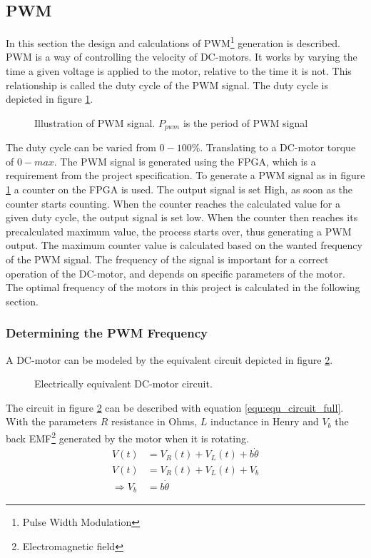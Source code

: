 \documentclass[../../../Main]{subfiles}
\begin{document}
\subsection{PWM}
\label{sec:pwm}
In this section the design  and calculations of PWM\footnote{Pulse Width Modulation} generation is described. PWM is a way of controlling the velocity of DC-motors. It works by varying the time a given voltage is applied to the motor, relative to the time it is not. This relationship is called the duty cycle of the PWM signal. The duty cycle is depicted in figure \ref{fig:pwm}.

\begin{figure}[h]
  
  \caption{Illustration of PWM signal. $P_{pwm}$ is the period of PWM signal}
  \label{fig:pwm}
\end{figure}

The duty cycle can be varied from $0 - 100\%$. Translating to a DC-motor torque of $0 - max$.
The PWM signal is generated using the FPGA, which is a requirement from the project specification. To generate a PWM signal as in figure \ref{fig:pwm} a counter on the FPGA  is used.
The output signal is set High, as soon as the counter starts counting. When the counter reaches the calculated value for a given duty cycle, the output signal is set low. When the counter then reaches its precalculated maximum value, the process starts over, thus generating a PWM output. The maximum counter value is calculated based on the wanted frequency of the PWM signal. The frequency of the signal is important for a correct operation of the DC-motor, and depends on specific parameters of the motor. The optimal frequency of the motors in this project is calculated in the following section.

\subsubsection{Determining the PWM Frequency}

A DC-motor can be modeled by the equivalent circuit depicted in figure \ref{fig:electrical_equ}.

\begin{figure}[ht]
	\center
    \def\svgwidth{0.5\textwidth}
	
	\caption{Electrically equivalent DC-motor circuit.}
  \label{fig:electrical_equ}
\end{figure}
The circuit in figure \ref{fig:electrical_equ} can be described with equation \eqref{equ:equ_circuit_full}. With the parameters $R$ resistance in Ohms, $L$ inductance in Henry and $V_b$ the back EMF\footnote{Electromagnetic field} generated by the motor when it is rotating.
\begin{align}
	V(t) &= V_R(t) + V_L(t) + b\dot{\theta}\\
 \label{equ:equ_circuit_full}
	V(t) &= V_R(t) + V_L(t) + V_b\\
	\Rightarrow V_b &= b\dot{\theta}
\end{align}
\end{document}
